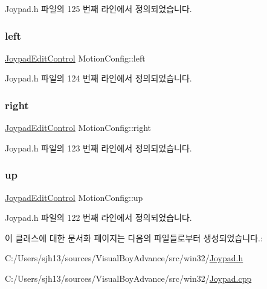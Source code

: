 Joypad.\+h 파일의 125 번째 라인에서 정의되었습니다.

\mbox{\label{class_motion_config_a634ed163b30d08aceb8573542ee7fc07}} 
\subsubsection{\texorpdfstring{left}{left}}
{\footnotesize\ttfamily \mbox{\hyperlink{class_joypad_edit_control}{Joypad\+Edit\+Control}} Motion\+Config\+::left}



Joypad.\+h 파일의 124 번째 라인에서 정의되었습니다.

\mbox{\label{class_motion_config_ae9203bef30efdd067ea44d1f7cded8dc}} 
\subsubsection{\texorpdfstring{right}{right}}
{\footnotesize\ttfamily \mbox{\hyperlink{class_joypad_edit_control}{Joypad\+Edit\+Control}} Motion\+Config\+::right}



Joypad.\+h 파일의 123 번째 라인에서 정의되었습니다.

\mbox{\label{class_motion_config_a44c25ec4fbd230d6fe19416d8c280157}} 
\subsubsection{\texorpdfstring{up}{up}}
{\footnotesize\ttfamily \mbox{\hyperlink{class_joypad_edit_control}{Joypad\+Edit\+Control}} Motion\+Config\+::up}



Joypad.\+h 파일의 122 번째 라인에서 정의되었습니다.



이 클래스에 대한 문서화 페이지는 다음의 파일들로부터 생성되었습니다.\+:\begin{DoxyCompactItemize}
\item 
C\+:/\+Users/sjh13/sources/\+Visual\+Boy\+Advance/src/win32/\mbox{\hyperlink{_joypad_8h}{Joypad.\+h}}\item 
C\+:/\+Users/sjh13/sources/\+Visual\+Boy\+Advance/src/win32/\mbox{\hyperlink{_joypad_8cpp}{Joypad.\+cpp}}\end{DoxyCompactItemize}
